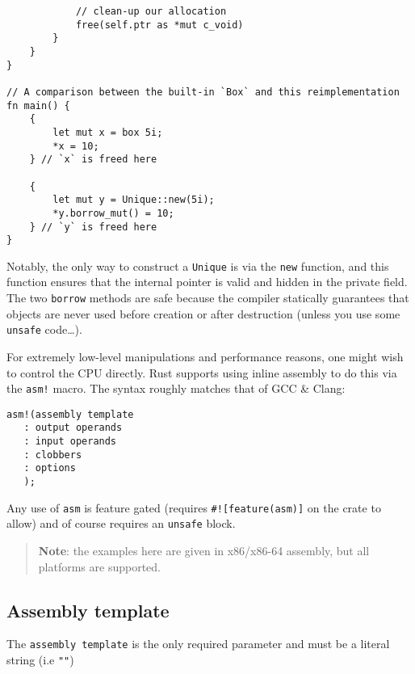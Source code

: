 \documentclass[]{article}
\begin{document}
\begin{verbatim}
            // clean-up our allocation
            free(self.ptr as *mut c_void)
        }
    }
}

// A comparison between the built-in `Box` and this reimplementation
fn main() {
    {
        let mut x = box 5i;
        *x = 10;
    } // `x` is freed here

    {
        let mut y = Unique::new(5i);
        *y.borrow_mut() = 10;
    } // `y` is freed here
}
\end{verbatim}

Notably, the only way to construct a \texttt{Unique} is via the
\texttt{new} function, and this function ensures that the internal
pointer is valid and hidden in the private field. The two
\texttt{borrow} methods are safe because the compiler statically
guarantees that objects are never used before creation or after
destruction (unless you use some \texttt{unsafe} code\ldots{}).


For extremely low-level manipulations and performance reasons, one might
wish to control the CPU directly. Rust supports using inline assembly to
do this via the \texttt{asm!} macro. The syntax roughly matches that of
GCC \& Clang:

\begin{verbatim}
asm!(assembly template
   : output operands
   : input operands
   : clobbers
   : options
   );
\end{verbatim}

Any use of \texttt{asm} is feature gated (requires
\texttt{\#!{[}feature(asm){]}} on the crate to allow) and of course
requires an \texttt{unsafe} block.

\begin{quote}
\textbf{Note}: the examples here are given in x86/x86-64 assembly, but
all platforms are supported.
\end{quote}

\subsection{Assembly template}\label{assembly-template}

The \texttt{assembly template} is the only required parameter and must
be a literal string (i.e \texttt{""})
\end{document}

